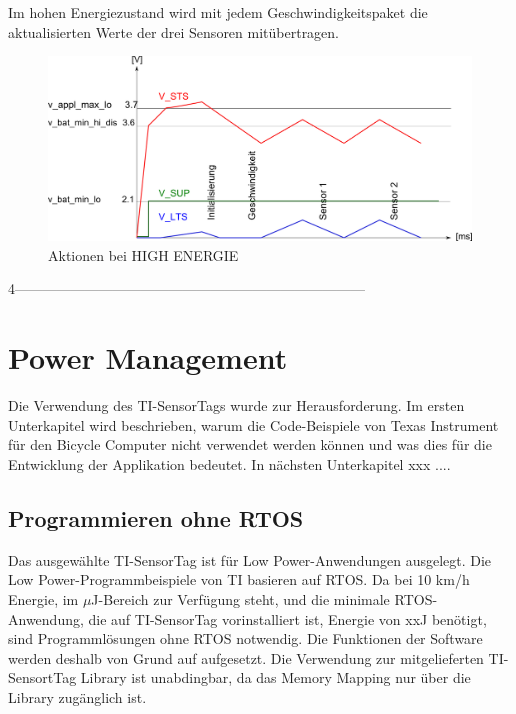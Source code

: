 Im hohen Energiezustand wird mit jedem Geschwindigkeitspaket die aktualisierten Werte der drei Sensoren mitübertragen. 

\begin{figure}[ht]
  \includegraphics[width=1.0\textwidth]{3Vorgehen/imag/HIGH_ENERGY.png}
  \caption{Aktionen bei HIGH ENERGIE}
  \label{HIGH_ENER}
\end{figure}







 4---------------------------------------------------------------------------
\section{Power Management}
\label{powerOptimierung}

Die Verwendung des TI-SensorTags wurde zur Herausforderung. Im ersten Unterkapitel wird beschrieben, warum die Code-Beispiele von Texas Instrument für den Bicycle Computer nicht verwendet werden können und was dies für die Entwicklung der Applikation bedeutet. In nächsten Unterkapitel xxx ....




\subsection{Programmieren ohne RTOS}

Das ausgewählte TI-SensorTag ist für Low Power-Anwendungen ausgelegt. Die Low Power-Programmbeispiele von TI basieren auf RTOS. Da bei 10 km/h Energie, im $\mu$J-Bereich zur Verfügung steht, und die minimale RTOS-Anwendung, die auf TI-SensorTag vorinstalliert ist, Energie von xxJ benötigt, sind Programmlösungen ohne RTOS notwendig. Die Funktionen der Software werden deshalb von Grund auf aufgesetzt. Die Verwendung zur mitgelieferten TI-SensortTag Library ist unabdingbar, da das Memory Mapping nur über die Library zugänglich ist. 

